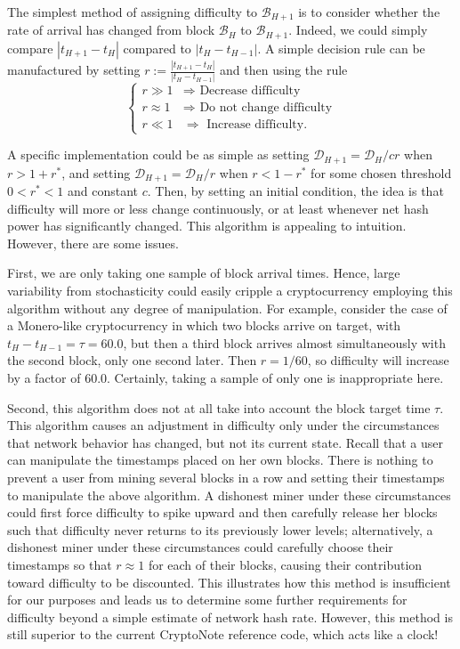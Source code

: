 \documentclass[12pt,english]{mrl}
\theoremstyle{definition}
\numberwithin{equation}{section}
\numberwithin{figure}{section}
\numberwithin{equation}{section}
\numberwithin{equation}{section}
\numberwithin{figure}{section}
\begin{document}
The simplest method of assigning difficulty to $\mathcal{B}_{H+1}$ is to consider whether the rate of arrival has changed from block $\mathcal{B}_{H}$ to $\mathcal{B}_{H+1}$. Indeed, we could simply compare $\left|t_{H+1} - t_{H}\right|$ compared to $\left|t_{H} - t_{H-1}\right|$. A simple decision rule can be manufactured by setting $r:= \displaystyle \frac{\left|t_{H+1} - t_{H}\right|}{\left|t_{H} - t_{H-1}\right|}$ and then using the rule
\begin{equation*}
\begin{cases}
r \gg 1 & \Rightarrow \text{~Decrease difficulty}\\
r \approx 1 & \Rightarrow \text{~Do not change difficulty}\\
r \ll 1 & \Rightarrow \text{~Increase difficulty}.
\end{cases}
\end{equation*}

A specific implementation could be as simple as setting $\mathcal{D}_{H+1} = \mathcal{D}_{H}/cr$ when $r > 1+ r^{*}$, and setting $\mathcal{D}_{H+1} = \mathcal{D}_{H}/r$ when $r < 1 - r^{*}$ for some chosen threshold $0 < r^{*} < 1$ and constant $c$. Then, by setting an initial condition, the idea is that difficulty will more or less change continuously, or at least whenever net hash power has significantly changed. This algorithm is appealing to intuition. However, there are some issues.

First, we are only taking one sample of block arrival times. Hence, large variability from stochasticity could easily cripple a cryptocurrency employing this algorithm without any degree of manipulation. For example, consider the case of a Monero-like cryptocurrency in which two blocks arrive on target, with $t_{H}-t_{H-1} = \tau = 60.0$, but then a third block arrives almost simultaneously with the second block, only one second later. Then $r = 1/60$, so difficulty will increase by a factor of $60.0$. Certainly, taking a sample of only one is inappropriate here.

Second, this algorithm does not at all take into account the block target time $\tau$. This algorithm causes an adjustment in difficulty only under the circumstances that network behavior has changed, but not its current state. Recall that a user can manipulate the timestamps placed on her own blocks. There is nothing to prevent a user from mining several blocks in a row and setting their timestamps to manipulate the above algorithm.  A dishonest miner under these circumstances could first force difficulty to spike upward and then carefully release her blocks such that difficulty never returns to its previously lower levels; alternatively, a dishonest miner under these circumstances could carefully choose their timestamps so that $r \approx 1$ for each of their blocks, causing their contribution toward difficulty to be discounted. This illustrates how this method is insufficient for our purposes and leads us  to determine some further requirements for difficulty beyond a simple estimate of network hash rate.  However, this method is still superior to the current CryptoNote reference code, which acts like a clock!
\end{document}
